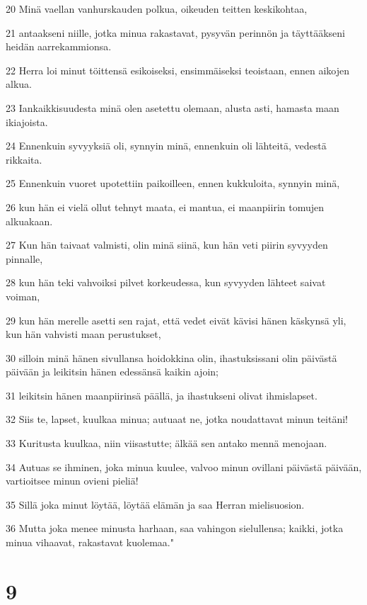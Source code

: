 \par 20 Minä vaellan vanhurskauden polkua, oikeuden teitten keskikohtaa,
\par 21 antaakseni niille, jotka minua rakastavat, pysyvän perinnön ja täyttääkseni heidän aarrekammionsa.
\par 22 Herra loi minut töittensä esikoiseksi, ensimmäiseksi teoistaan, ennen aikojen alkua.
\par 23 Iankaikkisuudesta minä olen asetettu olemaan, alusta asti, hamasta maan ikiajoista.
\par 24 Ennenkuin syvyyksiä oli, synnyin minä, ennenkuin oli lähteitä, vedestä rikkaita.
\par 25 Ennenkuin vuoret upotettiin paikoilleen, ennen kukkuloita, synnyin minä,
\par 26 kun hän ei vielä ollut tehnyt maata, ei mantua, ei maanpiirin tomujen alkuakaan.
\par 27 Kun hän taivaat valmisti, olin minä siinä, kun hän veti piirin syvyyden pinnalle,
\par 28 kun hän teki vahvoiksi pilvet korkeudessa, kun syvyyden lähteet saivat voiman,
\par 29 kun hän merelle asetti sen rajat, että vedet eivät kävisi hänen käskynsä yli, kun hän vahvisti maan perustukset,
\par 30 silloin minä hänen sivullansa hoidokkina olin, ihastuksissani olin päivästä päivään ja leikitsin hänen edessänsä kaikin ajoin;
\par 31 leikitsin hänen maanpiirinsä päällä, ja ihastukseni olivat ihmislapset.
\par 32 Siis te, lapset, kuulkaa minua; autuaat ne, jotka noudattavat minun teitäni!
\par 33 Kuritusta kuulkaa, niin viisastutte; älkää sen antako mennä menojaan.
\par 34 Autuas se ihminen, joka minua kuulee, valvoo minun ovillani päivästä päivään, vartioitsee minun ovieni pieliä!
\par 35 Sillä joka minut löytää, löytää elämän ja saa Herran mielisuosion.
\par 36 Mutta joka menee minusta harhaan, saa vahingon sielullensa; kaikki, jotka minua vihaavat, rakastavat kuolemaa."

\chapter{9}

